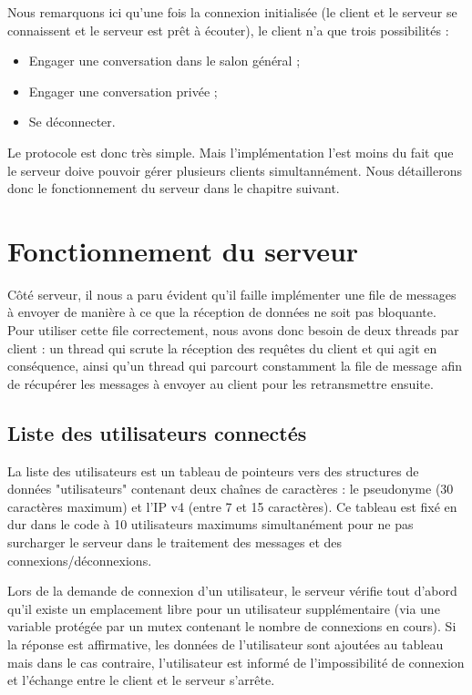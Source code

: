 		Nous remarquons ici qu'une fois la connexion initialisée (le client et le serveur se connaissent et le serveur est prêt à écouter), le client n'a que trois possibilités :
		\begin{itemize}
			\item Engager une conversation dans le salon général ;
			\item Engager une conversation privée ;
			\item Se déconnecter.
		\end{itemize}
		
		Le protocole est donc très simple. Mais l'implémentation l'est moins du fait que le serveur doive pouvoir gérer plusieurs clients simultannément. Nous détaillerons donc le fonctionnement du serveur dans le chapitre suivant.
	
	\section{Fonctionnement du serveur}
		
		Côté serveur, il nous a paru évident qu'il faille implémenter une file de messages à envoyer de manière à ce que la réception de données ne soit pas bloquante. Pour utiliser cette file correctement, nous avons donc besoin de deux threads par client : un thread qui scrute la réception des requêtes du client et qui agit en conséquence, ainsi qu'un thread qui parcourt constamment la file de message afin de récupérer les messages à envoyer au client pour les retransmettre ensuite.
	
		\subsection{Liste des utilisateurs connectés}
			
			La liste des utilisateurs est un tableau de pointeurs vers des structures de données "utilisateurs" contenant deux chaînes de caractères : le pseudonyme (30 caractères maximum) et l'IP v4 (entre 7 et 15 caractères). Ce tableau est fixé en dur dans le code à 10 utilisateurs maximums simultanément pour ne pas surcharger le serveur dans le traitement des messages et des connexions/déconnexions.
			
			Lors de la demande de connexion d'un utilisateur, le serveur vérifie tout d'abord qu'il existe un emplacement libre pour un utilisateur supplémentaire (via une variable protégée par un mutex contenant le nombre de connexions en cours). Si la réponse est affirmative, les données de l'utilisateur sont ajoutées au tableau mais dans le cas contraire, l'utilisateur est informé de l'impossibilité de connexion et l'échange entre le client et le serveur s'arrête.
			
